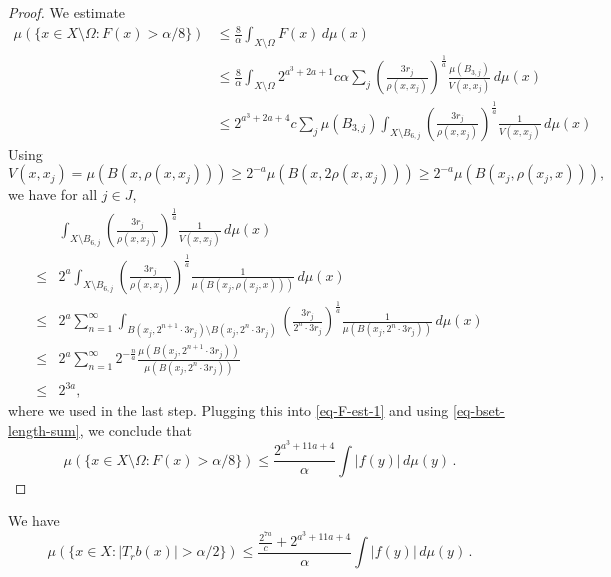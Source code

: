 \begin{proof}
    \leanok
    We estimate
    \begin{align}
        \mu(\{x\in X\setminus\Omega: F(x)> \alpha/8\})
        &\le \frac{8}{\alpha} \int_{X\setminus \Omega} F(x)\,d\mu(x) \\
        &\le \frac{8}{\alpha} \int_{X\setminus \Omega} 2^{a^3+2a+1} c\alpha \sum_{j} \left(\frac{3r_j}{\rho(x,x_j)}\right)^{\frac{1}{a}}\frac{\mu(B_{3,j})}{V(x,x_j)}\,d\mu(x) \\
        \label{eq-F-est-1}
        &\le 2^{a^3+2a+4} c \sum_{j} \mu(B_{3,j}) \int_{X\setminus B_{6,j}} \left(\frac{3r_j}{\rho(x,x_j)}\right)^{\frac{1}{a}}\frac{1}{V(x,x_j)}\,d\mu(x)
    \end{align}
    Using
    \begin{equation*}
        V(x,x_j) = \mu(B(x,\rho(x,x_j))) \ge 2^{-a}\mu(B(x,2\rho(x,x_j))) \ge 2^{-a} \mu(B(x_j,\rho(x_j,x))),
    \end{equation*}
    we have for all $j\in J$,
    \begin{align*}
        &\int_{X\setminus B_{6,j}} \left(\frac{3r_j}{\rho(x,x_j)}\right)^{\frac{1}{a}}\frac{1}{V(x,x_j)}\,d\mu(x) \\
        \le& 2^a \int_{X\setminus B_{6,j}} \left(\frac{3r_j}{\rho(x,x_j)}\right)^{\frac{1}{a}}\frac{1}{\mu(B(x_j,\rho(x_j,x)))}\,d\mu(x) \\
        \le&2^a \sum_{n=1}^\infty \int_{B(x_j,2^{n+1}\cdot3r_j)\setminus B(x_j,2^n\cdot3r_j)} \left(\frac{3r_j}{2^n \cdot3r_j}\right)^{\frac{1}{a}}\frac{1}{\mu(B(x_j,2^n \cdot3r_j))}\,d\mu(x) \\
        \le&2^a \sum_{n=1}^\infty 2^{-\frac{n}{a}} \frac{\mu(B(x_j,2^{n+1}\cdot3r_j))}{\mu(B(x_j,2^n \cdot3r_j))} \\
        \le&2^{3a},
    \end{align*}
    where we used  in the last step.
    Plugging this into \eqref{eq-F-est-1} and using \eqref{eq-bset-length-sum}, we conclude that
    \begin{equation*}
        \mu(\{x\in X\setminus\Omega: F(x)> \alpha/8\}) \le \frac{2^{a^3+11a+4}}{\alpha} \int |f(y)|\,d\mu(y)\,.
    \end{equation*}
\end{proof}


\begin{lemma}
    \label{estimate-bad}
    \leanok
    We have
    \begin{equation*}
        \mu\left({\{x\in X: |T_r b(x)|>\alpha/2\}}\right) \le  \frac{\frac{2^{7a}}{c} + 2^{a^3+11a+4}}{\alpha} \int |f(y)|\,d\mu(y) \,.
    \end{equation*}
\end{lemma}

